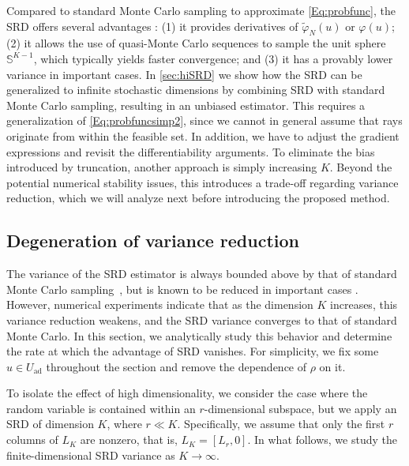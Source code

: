 \documentclass[%
onefignum,onetabnum]{siamonline250211}
\newcommand{\bbS}{\mathbb S}
\begin{document}
Compared to standard Monte Carlo sampling to approximate \eqref{Eq:probfunc}, the SRD offers several advantages \cite{HeStWe-SIAM25, AcHe-SIAM14, AcHe-SIAM17, AcPe-AMO22}: (1) it provides derivatives of $\tilde\varphi_N(u)$ or $\varphi(u)$; (2) it allows the use of quasi-Monte Carlo sequences to sample the unit sphere $\bbS^{K-1}$, which typically yields faster convergence; and (3) it has a provably lower variance in important cases. In \cref{sec:hiSRD} we show how the SRD can be generalized to infinite stochastic dimensions by combining SRD with standard Monte Carlo sampling, resulting in an unbiased estimator. This requires a generalization of \eqref{Eq:probfuncsimp2}, since we cannot in general assume that rays originate from within the feasible set. In addition, we have to adjust the gradient expressions and revisit the differentiability arguments. To eliminate the bias introduced by truncation, another approach is simply increasing $K$. Beyond the potential numerical stability issues, this introduces a trade-off regarding variance reduction, which we will analyze next before introducing the proposed method.

\subsection{Degeneration of variance reduction}
The variance of the SRD estimator is always bounded above by that of standard Monte Carlo sampling~\cite{AcHe-SIAM14}, but is known to be reduced in important cases \cite{HeStWe-SIAM25}. However, numerical experiments indicate that as the dimension $K$ increases, this variance reduction weakens, and the SRD variance converges to that of standard Monte Carlo.
In this section, we analytically study this behavior and determine the rate at which the advantage of SRD vanishes. For simplicity, we fix some $u\in U_{\text{ad}}$ throughout the section and remove the dependence of $\rho$ on it.

To isolate the effect of high dimensionality, we consider the case where the random variable is contained within an $r$-dimensional subspace, but we apply an SRD of dimension $K$, where $r \ll K$. Specifically, we assume that only the first $r$ columns of $L_K$ are nonzero, that is, $L_K=[L_r, 0]$. In what follows, we study the finite-dimensional SRD variance as $K\to\infty$.
\end{document}

